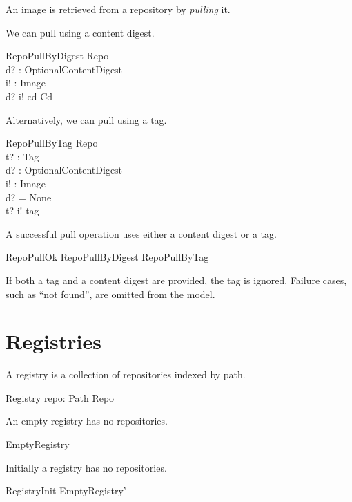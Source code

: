 \documentclass[a4paper,twoside,12pt]{article}
\begin{document}
\newpage
An image is retrieved from a repository by \textit{pulling} it.

We can pull using a content digest.
\begin{schema}{RepoPullByDigest}
  \Xi Repo \\
  d? : OptionalContentDigest \\
  i! : Image \\
\where
  d? \mapsto i! \in cd \circ Cd \\
\end{schema}

Alternatively, we can pull using a tag.
\begin{schema}{RepoPullByTag}
  \Xi Repo \\
  t? : Tag \\
  d? : OptionalContentDigest \\
  i! : Image \\
\where
  d? = None \\
  t? \mapsto i! \in tag \\
\end{schema}

A successful pull operation uses either a content digest or a tag.
\begin{zed}
  RepoPullOk  RepoPullByDigest \lor RepoPullByTag
\end{zed}
If both a tag and a content digest are provided, the tag is ignored. Failure cases, such as ``not found'', are omitted from the model.

\newpage
\section{Registries}

A registry is a collection of repositories indexed by path.
\begin{schema}{Registry}
    repo: Path \pfun Repo \\
\end{schema}

An empty registry has no repositories.
\begin{zed}
  EmptyRegistry 
\end{zed}

Initially a registry has no repositories.
\begin{zed}
  RegistryInit  EmptyRegistry'
\end{zed}
\end{document}
